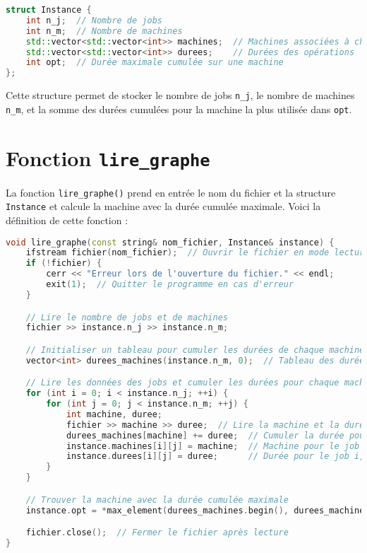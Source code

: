 \documentclass[a4paper,12pt]{article}
\begin{document}
\begin{lstlisting}[language=C++]
struct Instance {
    int n_j;  // Nombre de jobs
    int n_m;  // Nombre de machines
    std::vector<std::vector<int>> machines;  // Machines associées à chaque job
    std::vector<std::vector<int>> durees;    // Durées des opérations
    int opt;  // Durée maximale cumulée sur une machine
};
\end{lstlisting}

Cette structure permet de stocker le nombre de jobs \texttt{n\_j}, le nombre de machines \texttt{n\_m}, et la somme des durées cumulées pour la machine la plus utilisée dans \texttt{opt}.

\section{Fonction \texttt{lire\_graphe}}

La fonction \texttt{lire\_graphe()} prend en entrée le nom du fichier et la structure \texttt{Instance} et calcule la machine avec la durée cumulée maximale. Voici la définition de cette fonction :

\begin{lstlisting}[language=C++]
void lire_graphe(const string& nom_fichier, Instance& instance) {
    ifstream fichier(nom_fichier);  // Ouvrir le fichier en mode lecture
    if (!fichier) {
        cerr << "Erreur lors de l'ouverture du fichier." << endl;
        exit(1);  // Quitter le programme en cas d'erreur
    }

    // Lire le nombre de jobs et de machines
    fichier >> instance.n_j >> instance.n_m;

    // Initialiser un tableau pour cumuler les durées de chaque machine
    vector<int> durees_machines(instance.n_m, 0);  // Tableau des durées, initialisé à 0 pour chaque machine

    // Lire les données des jobs et cumuler les durées pour chaque machine
    for (int i = 0; i < instance.n_j; ++i) {
        for (int j = 0; j < instance.n_m; ++j) {
            int machine, duree;
            fichier >> machine >> duree;  // Lire la machine et la durée
            durees_machines[machine] += duree;  // Cumuler la durée pour cette machine
            instance.machines[i][j] = machine;  // Machine pour le job i, opération j
            instance.durees[i][j] = duree;      // Durée pour le job i, opération j
        }
    }

    // Trouver la machine avec la durée cumulée maximale
    instance.opt = *max_element(durees_machines.begin(), durees_machines.end());

    fichier.close();  // Fermer le fichier après lecture
}
\end{lstlisting}
\end{document}
